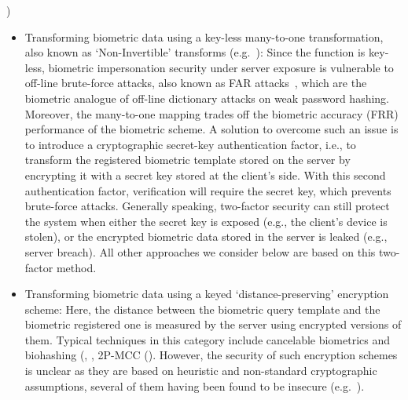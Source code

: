 \cite{jain2008biometric}) \begin{itemize} \item Transforming biometric data
  using a key-less many-to-one transformation, also known as `Non-Invertible'
  transforms (e.g.~\cite{ratha2007generating}): Since the function is key-less,
  biometric impersonation security under server exposure is vulnerable to
  off-line brute-force attacks, also known as FAR
  attacks~\cite{uludag2004attacks,roberts2007biometric}, which are the biometric
  analogue of off-line dictionary attacks on weak password hashing. Moreover,
  the many-to-one mapping trades off the biometric accuracy (FRR) performance of
  the biometric scheme. A solution to overcome such an issue is to introduce a
  cryptographic secret-key authentication factor, i.e., to transform the
  registered biometric template stored on the server by encrypting it with a
  secret key stored at the client's side. With this second authentication
  factor, verification will require the secret key, which prevents brute-force
  attacks. Generally speaking, two-factor security can still protect the system when either the secret key is exposed (e.g., the client's device is
  stolen), or the encrypted biometric data stored in the server is leaked (e.g.,
  server breach). All other approaches we consider below are based on this
  two-factor method.


\item Transforming biometric data using a keyed `distance-preserving' encryption scheme:  Here, the distance between the biometric query template and the biometric registered one is measured by the server using encrypted versions of them.  Typical techniques in this category include
            cancelable biometrics and biohashing (\cite{teoh2008cancellable}, \cite{jin2004biohashing}, 2P-MCC (\cite{cappelli2010minutia}). %
However, the security of such encryption schemes is unclear as they are based on heuristic and non-standard cryptographic assumptions, several of them having been found to be insecure (e.g.~\cite{lee2009inverse,lacharme2013preimage}).


\end{itemize}
